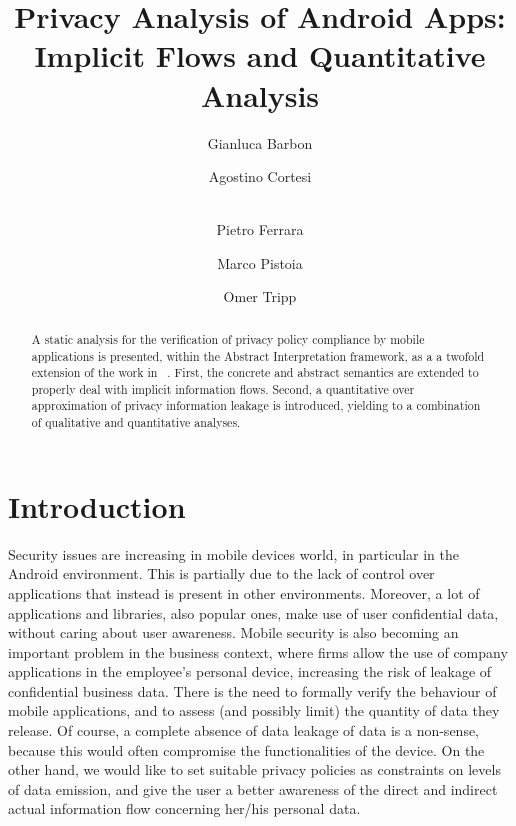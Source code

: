 \documentclass{llncs}
\begin{document}
\mainmatter

\title{Privacy Analysis of Android Apps:\\ Implicit Flows and Quantitative Analysis}



\author{ Gianluca Barbon  \and Agostino Cortesi \and  \\ Pietro Ferrara \and Marco Pistoia \and Omer Tripp}



\maketitle


\begin{abstract}
A static analysis  for the verification of privacy policy compliance by mobile applications is presented, within the Abstract Interpretation  framework, as a a twofold extension of the work in ~\cite{Cortesi15}. First, the concrete and abstract semantics are extended to properly deal with implicit information flows. Second, a quantitative over approximation of privacy information leakage is introduced, yielding to a combination of qualitative and quantitative analyses.  
\end{abstract}



\section{Introduction}

\noindent Security issues are increasing in mobile devices world, in particular in the Android environment. This is partially due to the lack of control over applications that instead is present in other environments. Moreover, a lot of applications and libraries, also popular ones, make use of user confidential data, without caring about user awareness. Mobile security is also becoming an important problem in the business context, where firms allow the use of company applications in  the employee's personal device, increasing the risk of leakage of confidential business data. There is the need to formally verify the behaviour of mobile applications, and to assess (and possibly limit) the quantity of data they release. 
Of course, a complete absence of data leakage of data is a non-sense, because this would often compromise the functionalities of the device. On the other hand, we would like to set suitable privacy policies as constraints on levels of data emission, and give the user a better awareness of the direct and indirect actual information flow concerning her/his personal data.
\end{document}
